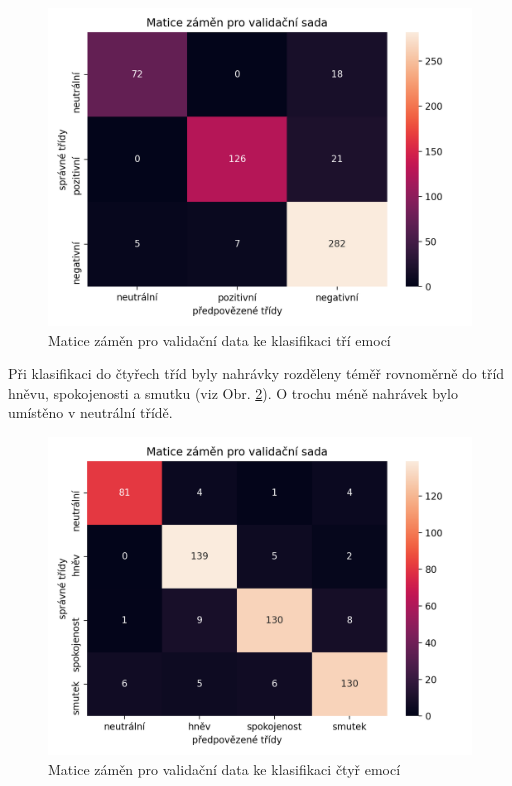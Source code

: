 \documentclass[FM,BP]{tulthesis}
\begin{document}
\begin{figure}[!htbp]
\centerline{\includegraphics[scale=.5]{3_emotions-conf_matrix-val.png}}
\caption{Matice záměn pro validační data ke klasifikaci tří emocí}
\label{fig:3_emotions-conf_matrix-val}
\end{figure}
\FloatBarrier

Při klasifikaci do čtyřech tříd byly nahrávky rozděleny téměř rovnoměrně do tříd hněvu, spokojenosti a smutku (viz Obr. \ref{fig:4_emotions-conf_matrix-val}). O trochu méně nahrávek bylo umístěno v neutrální třídě.

\begin{figure}[!htbp]
\centerline{\includegraphics[scale=.5]{4_emotions-conf_matrix-val.png}}
\caption{Matice záměn pro validační data ke klasifikaci čtyř emocí}
\label{fig:4_emotions-conf_matrix-val}
\end{figure}
\FloatBarrier
\end{document}
